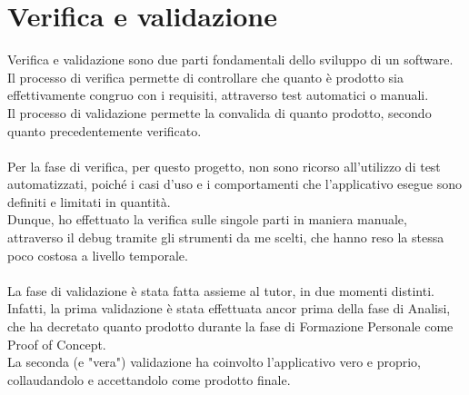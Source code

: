 \chapter{Verifica e validazione}
\label{cap:verifica-validazione}

Verifica e validazione sono due parti fondamentali dello sviluppo di un software.\\
Il processo di verifica permette di controllare che quanto è prodotto sia effettivamente congruo con i requisiti, attraverso test automatici o manuali.\\
Il processo di validazione permette la convalida di quanto prodotto, secondo quanto precedentemente verificato.\\\\
Per la fase di verifica, per questo progetto, non sono ricorso all'utilizzo di test automatizzati, poiché i casi d'uso e i comportamenti che l'applicativo esegue sono definiti e limitati in quantità.\\
Dunque, ho effettuato la verifica sulle singole parti in maniera manuale, attraverso il debug tramite gli strumenti da me scelti, che hanno reso la stessa poco costosa a livello temporale.\\\\
La fase di validazione è stata fatta assieme al tutor, in due momenti distinti.\\
Infatti, la prima validazione è stata effettuata ancor prima della fase di Analisi, che ha decretato quanto prodotto durante la fase di Formazione Personale come Proof of Concept.\\
La seconda (e "vera") validazione ha coinvolto l'applicativo vero e proprio, collaudandolo e accettandolo come prodotto finale.
